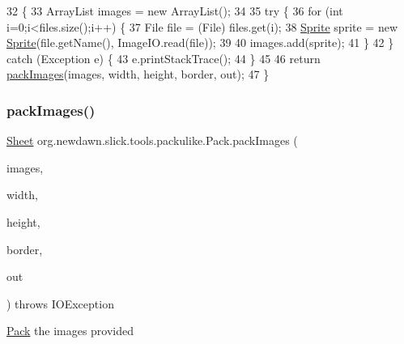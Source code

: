 \begin{DoxyCode}
32                                                                                                        \{
33         ArrayList images = \textcolor{keyword}{new} ArrayList();
34         
35         \textcolor{keywordflow}{try} \{
36             \textcolor{keywordflow}{for} (\textcolor{keywordtype}{int} i=0;i<files.size();i++) \{
37                 File file = (File) files.get(i);
38                 \mbox{\hyperlink{class_sprite}{Sprite}} sprite = \textcolor{keyword}{new} \mbox{\hyperlink{class_sprite}{Sprite}}(file.getName(), ImageIO.read(file));
39                 
40                 images.add(sprite);
41             \}
42         \} \textcolor{keywordflow}{catch} (Exception e) \{
43             e.printStackTrace();
44         \}
45         
46         \textcolor{keywordflow}{return} \mbox{\hyperlink{classorg_1_1newdawn_1_1slick_1_1tools_1_1packulike_1_1_pack_a303621f1e4590a9898ccbac6daa6c112}{packImages}}(images, width, height, border, out);
47     \}
\end{DoxyCode}
\mbox{\label{classorg_1_1newdawn_1_1slick_1_1tools_1_1packulike_1_1_pack_a303621f1e4590a9898ccbac6daa6c112}} 
\subsubsection{\texorpdfstring{pack\+Images()}{packImages()}}
{\footnotesize\ttfamily \mbox{\hyperlink{classorg_1_1newdawn_1_1slick_1_1tools_1_1packulike_1_1_sheet}{Sheet}} org.\+newdawn.\+slick.\+tools.\+packulike.\+Pack.\+pack\+Images (\begin{DoxyParamCaption}\item[{Array\+List}]{images,  }\item[{int}]{width,  }\item[{int}]{height,  }\item[{int}]{border,  }\item[{File}]{out }\end{DoxyParamCaption}) throws I\+O\+Exception\hspace{0.3cm}{\ttfamily [inline]}}

\mbox{\hyperlink{classorg_1_1newdawn_1_1slick_1_1tools_1_1packulike_1_1_pack}{Pack}} the images provided


